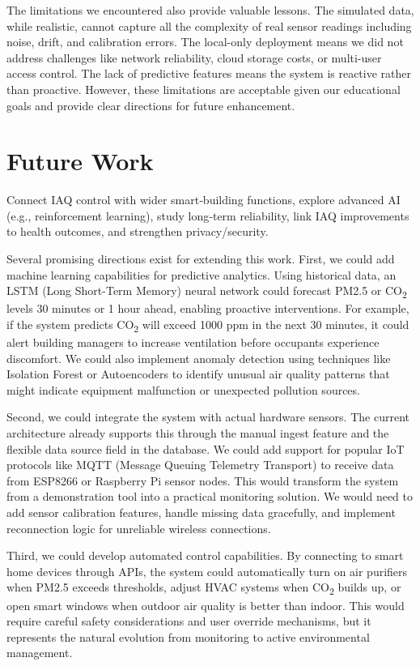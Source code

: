 \documentclass[12pt]{report}
\begin{document}
The limitations we encountered also provide valuable lessons. The simulated data, while realistic, cannot capture all the complexity of real sensor readings including noise, drift, and calibration errors. The local-only deployment means we did not address challenges like network reliability, cloud storage costs, or multi-user access control. The lack of predictive features means the system is reactive rather than proactive. However, these limitations are acceptable given our educational goals and provide clear directions for future enhancement.

\section{Future Work}
Connect IAQ control with wider smart‑building functions, explore advanced AI (e.g., reinforcement learning), study long‑term reliability, link IAQ improvements to health outcomes, and strengthen privacy/security.

Several promising directions exist for extending this work. First, we could add machine learning capabilities for predictive analytics. Using historical data, an LSTM (Long Short-Term Memory) neural network could forecast PM2.5 or CO\textsubscript{2} levels 30 minutes or 1 hour ahead, enabling proactive interventions. For example, if the system predicts CO\textsubscript{2} will exceed 1000 ppm in the next 30 minutes, it could alert building managers to increase ventilation before occupants experience discomfort. We could also implement anomaly detection using techniques like Isolation Forest or Autoencoders to identify unusual air quality patterns that might indicate equipment malfunction or unexpected pollution sources.

Second, we could integrate the system with actual hardware sensors. The current architecture already supports this through the manual ingest feature and the flexible data source field in the database. We could add support for popular IoT protocols like MQTT (Message Queuing Telemetry Transport) to receive data from ESP8266 or Raspberry Pi sensor nodes. This would transform the system from a demonstration tool into a practical monitoring solution. We would need to add sensor calibration features, handle missing data gracefully, and implement reconnection logic for unreliable wireless connections.

Third, we could develop automated control capabilities. By connecting to smart home devices through APIs, the system could automatically turn on air purifiers when PM2.5 exceeds thresholds, adjust HVAC systems when CO\textsubscript{2} builds up, or open smart windows when outdoor air quality is better than indoor. This would require careful safety considerations and user override mechanisms, but it represents the natural evolution from monitoring to active environmental management.
\end{document}

